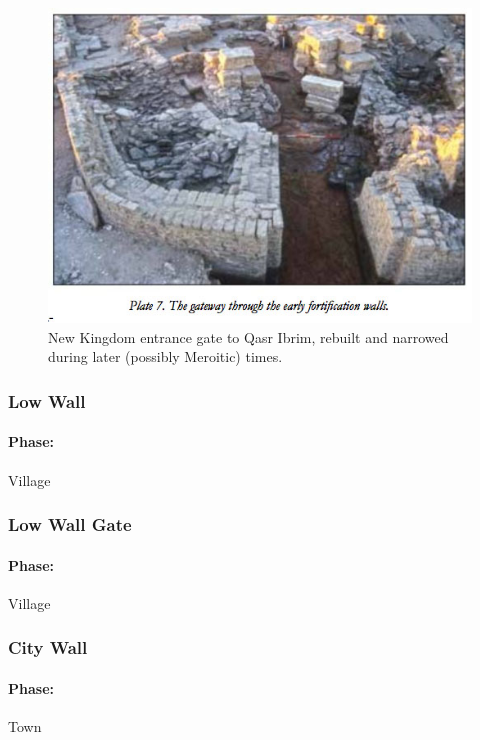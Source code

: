 \documentclass[a4paper,12pt]{scrreprt}
\begin{document}
\begin{figure}[H]
	\centering
	\includegraphics[width=\textwidth]{img/walls_gates/new_kingdom_entrance_gate}
	\caption{New Kingdom entrance gate to Qasr Ibrim, rebuilt and narrowed during later (possibly Meroitic) times.}
\end{figure}

\subsubsection{Low Wall}

\paragraph{Phase:} Village\\

\subsubsection{Low Wall Gate}

\paragraph{Phase:} Village\\

\subsubsection{City Wall}

\paragraph{Phase:} Town\\
\end{document}
